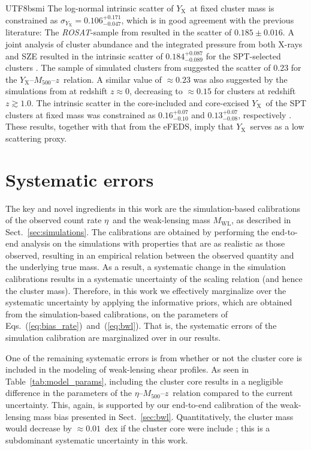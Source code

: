 \documentclass[longauth]{aa}
\newcommand{\Mfiveoo}{\ensuremath{M_{500}}}
\newcommand{\redshift}{\ensuremath{z}}
\newcommand{\ROSAT}{\emph{ROSAT}}
\newcommand{\Mwl}{\ensuremath{M_{\mathrm{WL}}}}
\newcommand{\Yx}{\ensuremath{Y_{\mathrm{X}}}}
\newcommand{\rate}{\ensuremath{\eta}}
\newcommand{\sigmay}{\ensuremath{\sigma_{Y_{\mathrm{X}}}}}
\newcommand{\anssigmay}{\ensuremath{ 0.106^{+0.171}_{-0.047} }}
\begin{document}
\begin{CJK*}{UTF8}{bsmi}
The log-normal intrinsic scatter of \Yx\ at fixed cluster mass is constrained as $\sigmay = \anssigmay$, which is in good agreement with the previous literature:
The \ROSAT-sample from \cite{mantz16b} resulted in the scatter of $0.185\pm0.016$.
A joint analysis of cluster abundance and the integrated pressure from both X-rays and SZE resulted in the intrinsic scatter of $0.184^{+0.087}_{-0.089}$ for the SPT-selected clusters \citep{bocquet19}.
The sample of simulated clusters from \cite{barnes17} suggested the scatter of $0.23$ for the \Yx--\Mfiveoo--\redshift\ relation.
A similar value of $\approx0.23$ was also suggested by the simulations from \cite{henden19} at redshift $\redshift\approx0$, decreasing to $\approx0.15$ for clusters at redshift $\redshift\gtrsim1.0$.
The intrinsic scatter in the core-included and core-excised \Yx\ of the SPT clusters at fixed mass was constrained as $0.16^{+0.07}_{-0.10}$ and $0.13^{+0.07}_{-0.08}$, respectively \citep{bulbul19}.
These results, together with that from the eFEDS, imply that \Yx\ serves as a low scattering proxy.

%
%

\section{Systematic errors}
\label{sec:sys}

The key and novel ingredients in this work are the simulation-based calibrations of the observed count rate \rate\ and the weak-lensing mass \Mwl, as described in Sect.~\ref{sec:simulations}.
The calibrations are obtained by performing the end-to-end analysis on the simulations with properties that are as realistic as those observed, resulting in an empirical relation between the observed quantity and the underlying true mass.
As a result, a systematic change in the simulation calibrations  results in a systematic uncertainty of the scaling relation (and hence the cluster mass).
Therefore, in this work we effectively marginalize over the systematic uncertainty by applying the informative priors, which are obtained from the simulation-based calibrations, on the parameters of Eqs.~(\ref{eq:bias_rate})~and~(\ref{eq:bwl}).
That is, the systematic errors of the simulation calibration are marginalized over in our results.

One of the remaining systematic errors is from whether or not the cluster core is included in the modeling of weak-lensing shear profiles.
As seen in Table~\ref{tab:model_params}, including the cluster core results in a negligible difference in the parameters of the \rate--\Mfiveoo--\redshift\ relation compared to the current uncertainty.
This, again, is supported by our end-to-end calibration of the weak-lensing mass bias presented in Sect.~\ref{sec:bwl}.
Quantitatively, the cluster mass would decrease by $\approx0.01$~dex if the cluster core were include ; this is a subdominant systematic uncertainty in this work.


\end{CJK*}
\end{document}

